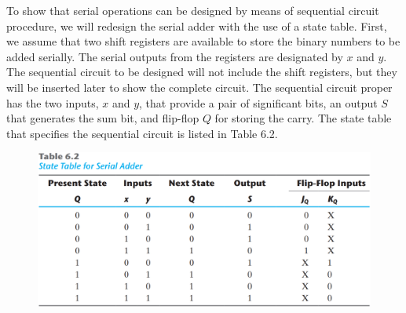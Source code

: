 To show that serial operations can be designed by means of sequential circuit procedure, we will redesign the serial adder with the use of a state table. First, we assume that two shift registers are available to store the binary numbers to be added serially. The serial outputs from the registers are designated by $x$ and $y$. The sequential circuit to be designed will not include the shift registers, but they will be inserted later to show the complete circuit. The sequential circuit proper has the two inputs, $x$ and $y$, that provide a pair of significant bits, an output $S$ that generates the sum bit, and flip-flop $Q$ for storing the carry. The state table that specifies the sequential circuit is listed in Table 6.2.
\vspace*{\fill}
\columnbreak
\begin{figure}[H]
  \centering
  \includegraphics[width=\linewidth]{img/table-6.2.png}
  \label{table:6.2}
\end{figure}

